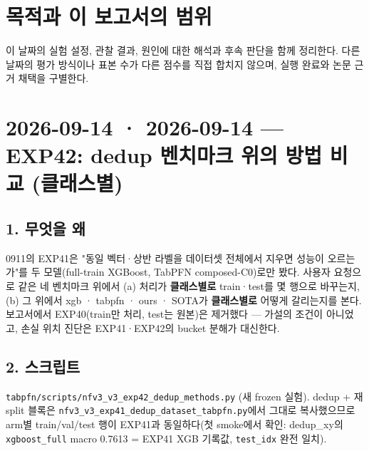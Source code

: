 




\section*{목적과 이 보고서의 범위}

이 날짜의 실험 설정, 관찰 결과, 원인에 대한 해석과 후속 판단을 함께 정리한다. 다른 날짜의 평가 방식이나 표본 수가 다른 점수를 직접 합치지 않으며, 실행 완료와 논문 근거 채택을 구별한다.


\section{2026-09-14 · 2026-09-14 — EXP42: dedup 벤치마크 위의 방법 비교 (클래스별)}
\label{report:20260914_0914}
\subsection{1. 무엇을 왜}
0911의 EXP41은 "동일 벡터·상반 라벨을 데이터셋 전체에서 지우면 성능이 오르는가"를 두 모델(full-train XGBoost, TabPFN composed-C0)로만 봤다. 사용자 요청으로 같은 네 벤치마크 위에서 (a) 처리가 \textbf{클래스별로} train·test를 몇 행으로 바꾸는지, (b) 그 위에서 xgb · tabpfn · ours · SOTA가 \textbf{클래스별로} 어떻게 갈리는지를 본다. 보고서에서 EXP40(train만 처리, test는 원본)은 제거했다 — 가설의 조건이 아니었고, 손실 위치 진단은 EXP41·EXP42의 bucket 분해가 대신한다.

\subsection{2. 스크립트}
\texttt{tabpfn/\allowbreak{}\allowbreak{}s\allowbreak{}cripts/\allowbreak{}\allowbreak{}n\allowbreak{}fv3\_\allowbreak{}\allowbreak{}v3\_\allowbreak{}\allowbreak{}e\allowbreak{}xp42\_\allowbreak{}\allowbreak{}ded\allowbreak{}up\_\allowbreak{}\allowbreak{}metho\allowbreak{}ds.\allowbreak{}py} (새 frozen 실험). dedup +\allowbreak{} 재split 블록은 \texttt{nfv3\_\allowbreak{}\allowbreak{}v3\_\allowbreak{}\allowbreak{}exp41\_\allowbreak{}\allowbreak{}de\allowbreak{}dup\_\allowbreak{}\allowbreak{}data\allowbreak{}set\_\allowbreak{}\allowbreak{}tabp\allowbreak{}fn.\allowbreak{}py}에서 그대로 복사했으므로 arm별 train/\allowbreak{}val/\allowbreak{}test 행이 EXP41과 동일하다(첫 smoke에서 확인: dedup\_\allowbreak{}xy의 \texttt{xgboost\_\allowbreak{}\allowbreak{}full} macro 0.7613 =\allowbreak{} EXP41 XGB 기록값, \texttt{test\_\allowbreak{}\allowbreak{}idx\allowbreak{}} 완전 일치).

